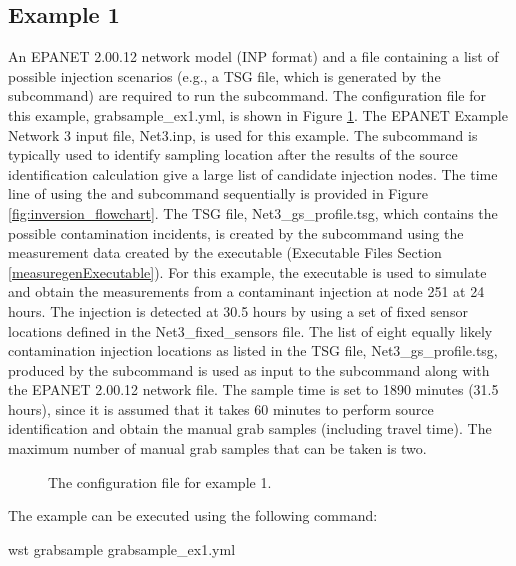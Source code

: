 \subsection{Example 1}
An EPANET 2.00.12 network model (INP format) and a file containing a list of
possible injection scenarios (e.g., a TSG file, which is generated by 
the  subcommand) are required to run the  subcommand. The
configuration file for this example, grabsample\_ex1.yml, is shown in
Figure \ref{fig:sampling_ex1}. The EPANET Example Network 3 input file,
Net3.inp, is used for this example. 
The  subcommand is typically used to identify sampling location 
after the results of the source identification calculation give a large list of
candidate injection nodes. The time line of using the  and 
subcommand sequentially is provided in Figure \ref{fig:inversion_flowchart}.
The TSG file, Net3\_gs\_profile.tsg, which contains the possible contamination incidents, is created by the  subcommand using the measurement data created by the   executable (Executable Files Section \ref{measuregenExecutable}). For this example, the  executable 
is used to simulate and obtain the measurements from a contaminant injection at node 251 at 24 hours.
The injection is detected at 30.5 hours by using a set of fixed sensor
locations defined in the Net3\_fixed\_sensors file.
The list of eight equally likely
contamination injection locations as listed in the TSG file, Net3\_gs\_profile.tsg, produced by the  subcommand is used as input to the 
 subcommand along with the EPANET 2.00.12 network file. 
The sample time is set to 1890
minutes (31.5 hours), since it is assumed that it takes 60 minutes to
perform source identification and obtain the manual grab samples (including travel time). 
The maximum number of manual grab samples that can be taken is two.

\begin{figure}[H]
  \caption{The  configuration file for example 1.}
  \label{fig:sampling_ex1}
\end{figure}

The example can be executed using the following command:
\begin{unknownListing}
wst grabsample grabsample_ex1.yml
\end{unknownListing}

